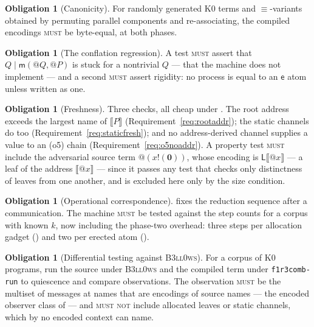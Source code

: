 \documentclass[11pt,a4paper]{article}
\makeatletter
\newcommand{\code}[1]{\texttt{#1}}
\newcommand{\Bell}{\textsc{B3ll0ws}}
\newcommand{\MUST}{\textsc{must}}
\newcommand{\MUSTNOT}{\textsc{must not}}
\newcommand{\quo}[1]{@#1}
\newcommand{\out}[2]{#1!(#2)}
\newcommand{\nil}{\mathbf{0}}
\newcommand{\enc}[1]{\llbracket #1 \rrbracket}
\newcommand{\mm}{\mathsf{m}}
\newcommand{\ev}{\mathsf{e}}
\newcommand{\Lft}{\mathsf{L}}
\newcommand{\scong}{\equiv}
\theoremstyle{definition}
\newtheorem{obligation}[definition]{Obligation}
\theoremstyle{plain}
\makeatother
\begin{document}
\begin{obligation}[Canonicity]\label{obl:canon}
For randomly generated K0 terms and $\scong$-variants obtained by permuting
parallel components and re-associating, the compiled encodings \MUST{} be
byte-equal, at both phases.
\end{obligation}

\begin{obligation}[The conflation regression]\label{obl:defect}
A test \MUST{} assert that $Q \mid \mm(\quo{Q},\quo{P})$ is stuck for a
nontrivial $Q$ --- that the machine does not implement
\cite[Prop.~3.5]{draft3} --- and a second \MUST{} assert rigidity: no process
is equal to an $\ev$ atom unless written as one.
\end{obligation}

\begin{obligation}[Freshness]\label{obl:fresh}
Three checks, all cheap under \cite[Lem.~6.14]{draft3}. The root address
exceeds the largest name of $\enc{P}$ (Requirement~\ref{req:rootaddr}); the
static channels do too (Requirement~\ref{req:staticfresh}); and no
address-derived channel supplies a value to an (o5) chain
(Requirement~\ref{req:o5noaddr}). A property test \MUST{} include the
adversarial source term $\quo{(\out{x}{\nil})}$, whose encoding is
$\Lft\enc{\quo{x}}$ --- a leaf of the address $\enc{\quo{x}}$ --- since it
passes any test that checks only distinctness of leaves from one another, and
is excluded here only by the size condition.
\end{obligation}

\begin{obligation}[Operational correspondence]\label{obl:opcorr}
\cite[Lem.~7.7]{draft3} fixes the reduction sequence after a communication.
The machine \MUST{} be tested against the step counts for a corpus with known
$k$, now including the phase-two overhead: three steps per allocation gadget
(\cite[Lem.~6.7]{draft3}) and two per erected atom
(\cite[Rem.~3.11]{draft3}).
\end{obligation}

\begin{obligation}[Differential testing against \Bell]\label{obl:diff}
For a corpus of K0 programs, run the source under \Bell{} and the compiled
term under \code{f1r3comb-run} to quiescence and compare observations. The
observation \MUST{} be the multiset of messages at names that are encodings of
source names --- the encoded observer class of \cite[Thm.~7.9]{draft3} --- and
\MUSTNOT{} include allocated leaves or static channels, which by
\cite[Lem.~7.6]{draft3} no encoded context can name.
\end{obligation}
\end{document}
